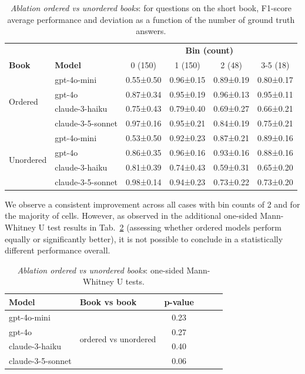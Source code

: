 \documentclass{article}
\begin{document}
\begin{table}[htbp]
\caption{\textit{Ablation ordered vs unordered books}: for questions on the short book, F1-score average performance and deviation as a function of the number of ground truth answers.}
\label{tab:results_20_get_all_questions_ablation_ordered_vs_unordered}
\centering
\begin{tabular}{@{}llcccc@{}}
\toprule
      & & \multicolumn{4}{c}{\bf Bin (count)}\\
 \bf Book & \bf Model & 0 (150) & 1 (150) & 2 (48) & 3-5 (18) \\ \midrule
\multirow{4}{*}{Ordered} & gpt-4o-mini & 0.55±0.50 & 0.96±0.15 & 0.89±0.19 & 0.80±0.17 \\
 & gpt-4o & 0.87±0.34   & 0.95±0.19 & 0.96±0.13 & 0.95±0.11 \\
 & claude-3-haiku & 0.75±0.43 & 0.79±0.40 & 0.69±0.27 & 0.66±0.21 \\
 & claude-3-5-sonnet & 0.97±0.16 & 0.95±0.21 & 0.84±0.19 & 0.75±0.21 \\ \midrule
 \multirow{4}{*}{Unordered} & gpt-4o-mini & 0.53±0.50 & 0.92±0.23 & 0.87±0.21 & 0.89±0.16 \\
 & gpt-4o & 0.86±0.35 & 0.96±0.16 &0.93±0.16 & 0.88±0.16 \\
 & claude-3-haiku & 0.81±0.39 & 0.74±0.43 & 0.59±0.31 & 0.65±0.20 \\
 & claude-3-5-sonnet & 0.98±0.14 & 0.94±0.23 & 0.73±0.22 & 0.73±0.20 \\ \bottomrule
\end{tabular}
\end{table}

We observe a consistent improvement across all cases with bin counts of 2 and for the majority of cells. However, as observed in the additional one-sided Mann-Whitney U test results in Tab.~\ref{tab:pvalue_ordered_vs_unordered} (assessing whether ordered models perform equally or significantly better), it is not possible to conclude in a statistically different performance overall.

\begin{table}[htbp]
\caption{\textit{Ablation ordered vs unordered books}: one-sided Mann-Whitney U tests.}
\label{tab:pvalue_ordered_vs_unordered}
\centering
\begin{tabular}{@{}llcccc@{}}
\toprule
 \bf Model & \bf Book vs book & \bf p-value \\ \midrule
 gpt-4o-mini & \multirow{4}{*}{ordered vs unordered} & 0.23 & \\
gpt-4o &    & 0.27 \\
claude-3-haiku &   & 0.40 \\
claude-3-5-sonnet &   & 0.06 \\ \bottomrule
\end{tabular}
\end{table}
\end{document}
